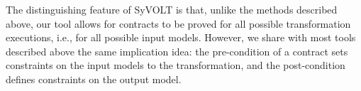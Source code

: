 The distinguishing feature of SyVOLT is that, unlike the methods described
above, our tool allows for contracts to be proved for all possible
transformation executions, i.e., for all possible input models.
However, we share with most tools described above the same implication idea: the
pre-condition of a contract sets constraints on the input models to the
transformation, and the post-condition defines constraints on the output model.





